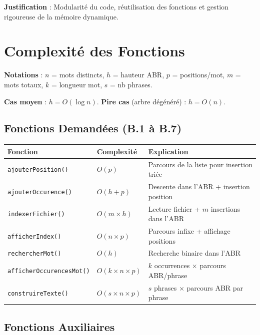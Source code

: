 \documentclass[12pt,a4paper]{article}
\begin{document}
\textbf{Justification} : Modularité du code, réutilisation des fonctions et gestion rigoureuse de la mémoire dynamique.

\section{Complexité des Fonctions}

\textbf{Notations} : $n$ = mots distincts, $h$ = hauteur ABR, $p$ = positions/mot, $m$ = mots totaux, $k$ = longueur mot, $s$ = nb phrases.

\vspace{0.3em}
\textbf{Cas moyen} : $h = O(\log n)$. \textbf{Pire cas} (arbre dégénéré) : $h = O(n)$.

\subsection{Fonctions Demandées (B.1 à B.7)}

\begin{tabular}{|l|l|p{7cm}|}
\hline
\textbf{Fonction} & \textbf{Complexité} & \textbf{Explication} \\
\hline
\texttt{ajouterPosition()} & $O(p)$ & Parcours de la liste pour insertion triée \\
\hline
\texttt{ajouterOccurence()} & $O(h + p)$ & Descente dans l'ABR + insertion position \\
\hline
\texttt{indexerFichier()} & $O(m \times h)$ & Lecture fichier + $m$ insertions dans l'ABR \\
\hline
\texttt{afficherIndex()} & $O(n \times p)$ & Parcours infixe + affichage positions \\
\hline
\texttt{rechercherMot()} & $O(h)$ & Recherche binaire dans l'ABR \\
\hline
\texttt{afficherOccurencesMot()} & $O(k \times n \times p)$ & $k$ occurrences $\times$ parcours ABR/phrase \\
\hline
\texttt{construireTexte()} & $O(s \times n \times p)$ & $s$ phrases $\times$ parcours ABR par phrase \\
\hline
\end{tabular}

\subsection{Fonctions Auxiliaires}
\end{document}
